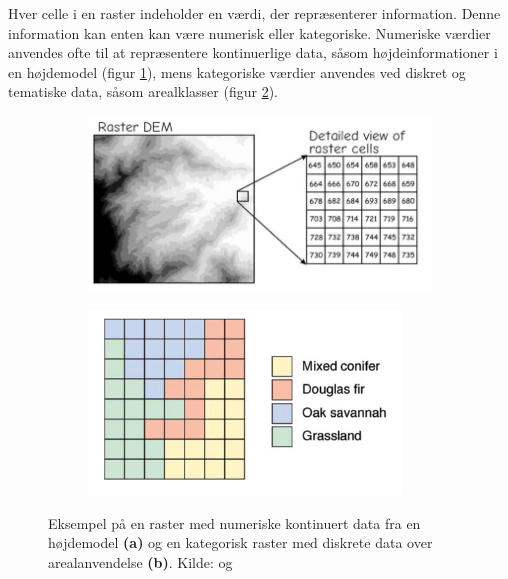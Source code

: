 Hver celle i en raster indeholder en værdi, der repræsenterer information. Denne information kan enten kan være numerisk eller kategoriske. Numeriske værdier anvendes ofte til at repræsentere kontinuerlige data, såsom højdeinformationer i en højdemodel (figur \ref{Subfig: Kontinuer raster}), mens kategoriske værdier anvendes ved diskret og tematiske data, såsom arealklasser (figur \ref{Subfig: Kategorisk raster}). 
\begin{figure}[H]
    \begin{subfigure} [t]{0.5\textwidth}
        \centering
        \includegraphics[width=1\linewidth]{images/teori/raster_kontinuert.jpg}
        \caption{}
        \label{Subfig: Kontinuer raster}
    \end{subfigure}
    \begin{subfigure} [t]{0.5\textwidth}
        \centering
        \includegraphics[width=1\linewidth]{images/teori/raster_areal.png}
        \caption{}
        \label{Subfig: Kategorisk raster}
    \end{subfigure}
    \caption{Eksempel på en raster med numeriske kontinuert data fra en højdemodel \textbf{(a)} og en kategorisk raster med diskrete data over arealanvendelse \textbf{(b)}. Kilde: \cite[s. 66]{bolstad_gis_2022} og \cite[s. 67]{longley_geographical_2008}}
    \label{Figur: Kontinuert og kategorisk raster}
\end{figure}

